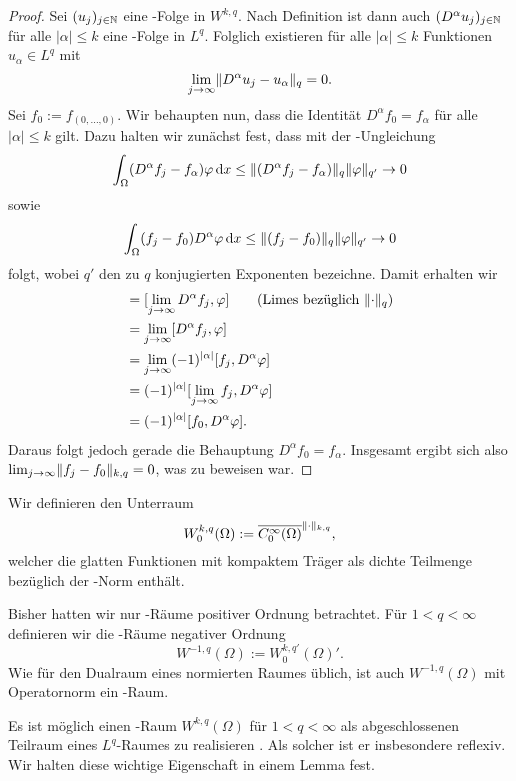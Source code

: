 \begin{proof}
  Sei $(u_j)_{j \in \mathbb{N}}$ eine \cauchy\hyp{}Folge in $W^{k,q}$.
  Nach Definition ist dann auch $(D^\alpha u_j)_{j \in \mathbb{N}}$ für alle $|\alpha| \leq k$ eine \cauchy\hyp{}Folge in $L^q$.
  Folglich existieren für alle $|\alpha| \leq k$ Funktionen $u_\alpha \in L^q$ mit 
  $$
  \lim_{j \to \infty} \lVert D^\alpha u_j - u_\alpha \rVert_q = 0.
  $$
  Sei $f_0 := f_{(0,\dots,0)}$.
  Wir behaupten nun, dass die Identität $D^\alpha f_0 = f_\alpha$ für alle $|\alpha| \leq k$ gilt.
  Dazu halten wir zunächst fest, dass mit der \hoelder\hyp{}Ungleichung
  $$
  \int_\Omega (D^\alpha f_j - f_\alpha) \varphi \, {\operatorname{d}\!{x}}
  \leq \lVert (D^\alpha f_j - f_\alpha) \rVert_q \lVert \varphi \rVert_{q'} \to 0
  $$
  sowie
  $$
  \int_\Omega (f_j - f_0) D^\alpha \varphi \, {\operatorname{d}\!{x}}
  \leq \lVert (f_j - f_0) \rVert_q \lVert \varphi \rVert_{q'} \to 0
  $$
  folgt, wobei $q'$ den zu $q$ konjugierten Exponenten bezeichne.
  Damit erhalten wir
  \begin{align*}
    [f_\alpha, \varphi] 
    &= [\lim_{j \to \infty} D^\alpha f_j, \varphi] \tag{Limes bezüglich $\norm{\cdot}_q$} \\
    &= \lim_{j \to \infty} [D^\alpha f_j, \varphi] \\
    &= \lim_{j \to \infty} (-1)^{|\alpha|}[f_j, D^\alpha \varphi] \\
    &=  (-1)^{|\alpha|}[\lim_{j \to \infty} f_j, D^\alpha \varphi] \\
    &=  (-1)^{|\alpha|}[f_0, D^\alpha \varphi].
  \end{align*}
  Daraus folgt jedoch gerade die Behauptung $D^\alpha f_0 = f_\alpha$.
  Insgesamt ergibt sich also $\lim_{j \to \infty} \lVert f_j - f_0 \rVert_{k,q} =  0$, was zu beweisen war.
\end{proof}

Wir definieren den Unterraum
$$
  W_0^{k,q}(\Omega) := \overline{C_0^\infty(\Omega)}^{\lVert \cdot \rVert_{k,q}},
$$
welcher die glatten Funktionen mit kompaktem Träger als dichte Teilmenge bezüglich der \sobolev\hyp{}Norm enthält.

Bisher hatten wir nur \sobolev\hyp{}Räume positiver Ordnung betrachtet.
Für $1 < q < \infty$ definieren wir die \sobolev\hyp{}Räume negativer Ordnung 
$$
  W^{-1,q}(\Omega) := W_0^{k,q'}(\Omega)'.
$$
Wie für den Dualraum eines normierten Raumes üblich, ist auch $W^{-1,q}(\Omega)$ mit Operatornorm ein \banach\hyp{}Raum.

Es ist möglich einen \sobolev\hyp{}Raum $W^{k,q}(\Omega)$ für $1 < q < \infty$ als abgeschlossenen Teilraum eines $L^q$\hyp{}Raumes zu realisieren \cite[S.61, 3.5]{adams2003sobolev}.
Als solcher ist er insbesondere reflexiv.
Wir halten diese wichtige Eigenschaft in einem Lemma fest.

